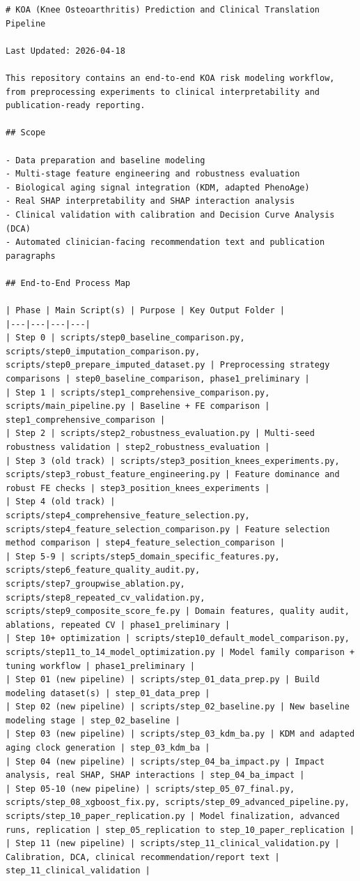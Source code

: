 ﻿\documentclass[11pt,a4paper]{article}
\begin{document}
\begin{verbatim}
# KOA (Knee Osteoarthritis) Prediction and Clinical Translation Pipeline

Last Updated: 2026-04-18

This repository contains an end-to-end KOA risk modeling workflow, from preprocessing experiments to clinical interpretability and publication-ready reporting.

## Scope

- Data preparation and baseline modeling
- Multi-stage feature engineering and robustness evaluation
- Biological aging signal integration (KDM, adapted PhenoAge)
- Real SHAP interpretability and SHAP interaction analysis
- Clinical validation with calibration and Decision Curve Analysis (DCA)
- Automated clinician-facing recommendation text and publication paragraphs

## End-to-End Process Map

| Phase | Main Script(s) | Purpose | Key Output Folder |
|---|---|---|---|
| Step 0 | scripts/step0_baseline_comparison.py, scripts/step0_imputation_comparison.py, scripts/step0_prepare_imputed_dataset.py | Preprocessing strategy comparisons | step0_baseline_comparison, phase1_preliminary |
| Step 1 | scripts/step1_comprehensive_comparison.py, scripts/main_pipeline.py | Baseline + FE comparison | step1_comprehensive_comparison |
| Step 2 | scripts/step2_robustness_evaluation.py | Multi-seed robustness validation | step2_robustness_evaluation |
| Step 3 (old track) | scripts/step3_position_knees_experiments.py, scripts/step3_robust_feature_engineering.py | Feature dominance and robust FE checks | step3_position_knees_experiments |
| Step 4 (old track) | scripts/step4_comprehensive_feature_selection.py, scripts/step4_feature_selection_comparison.py | Feature selection method comparison | step4_feature_selection_comparison |
| Step 5-9 | scripts/step5_domain_specific_features.py, scripts/step6_feature_quality_audit.py, scripts/step7_groupwise_ablation.py, scripts/step8_repeated_cv_validation.py, scripts/step9_composite_score_fe.py | Domain features, quality audit, ablations, repeated CV | phase1_preliminary |
| Step 10+ optimization | scripts/step10_default_model_comparison.py, scripts/step11_to_14_model_optimization.py | Model family comparison + tuning workflow | phase1_preliminary |
| Step 01 (new pipeline) | scripts/step_01_data_prep.py | Build modeling dataset(s) | step_01_data_prep |
| Step 02 (new pipeline) | scripts/step_02_baseline.py | New baseline modeling stage | step_02_baseline |
| Step 03 (new pipeline) | scripts/step_03_kdm_ba.py | KDM and adapted aging clock generation | step_03_kdm_ba |
| Step 04 (new pipeline) | scripts/step_04_ba_impact.py | Impact analysis, real SHAP, SHAP interactions | step_04_ba_impact |
| Step 05-10 (new pipeline) | scripts/step_05_07_final.py, scripts/step_08_xgboost_fix.py, scripts/step_09_advanced_pipeline.py, scripts/step_10_paper_replication.py | Model finalization, advanced runs, replication | step_05_replication to step_10_paper_replication |
| Step 11 (new pipeline) | scripts/step_11_clinical_validation.py | Calibration, DCA, clinical recommendation/report text | step_11_clinical_validation |


\end{verbatim}
\end{document}

